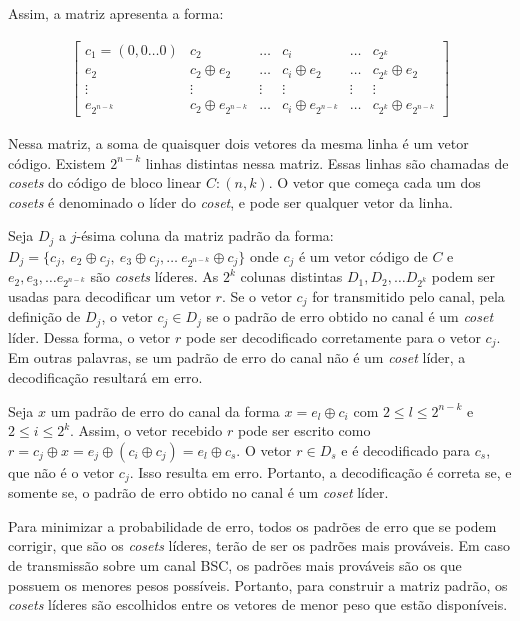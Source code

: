 Assim, a matriz apresenta a forma:

\begin{align*}
\left[\begin{array}{cccccc}
c_1=(0,0 \ldots 0) & c_2 & \ldots & c_i & \ldots & c_{2^k}\\
e_2 & c_2 \oplus e_2 & \ldots & c_i \oplus e_2 & \ldots & c_{2^k} \oplus e_2\\
\vdots & \vdots & \vdots & \vdots & \vdots & \vdots\\
e_{2^{n-k}} & c_2 \oplus e_{2^{n-k}} & \ldots & c_i \oplus e_{2^{n-k}} & \ldots & c_{2^k} \oplus e_{2^{n-k}}
\end{array}\right]
\end{align*}

Nessa matriz, a soma de quaisquer dois vetores da mesma linha é um vetor código. Existem  $2^{n-k}$ linhas distintas nessa matriz. Essas linhas são chamadas de \emph{cosets} do código de bloco linear $C:(n,k)$. O vetor que começa cada um dos \emph{cosets} é denominado o líder do \emph{coset}, e pode ser qualquer vetor da linha.

Seja $D_j$ a $j$-ésima coluna da matriz padrão da forma: $D_j=\{ c_j,\ e_2 \oplus c_j,\ e_3 \oplus c_j, \ldots\ e_{2^{n-k}} \oplus c_j\}$ onde $c_j$ é um vetor código de $C$ e $e_2, e_3, \ldots e_{2^{n-k}}$ são \emph{cosets} líderes. As $2^k$ colunas distintas $D_1, D_2, \ldots D_{2^{k}}$ podem ser usadas para decodificar um vetor $r$. Se o vetor $c_j$ for transmitido pelo canal, pela definição de $D_j$, o vetor $c_j \in D_j$ se o padrão de erro obtido no canal é um \emph{coset} líder. Dessa forma, o vetor $r$ pode ser decodificado corretamente para o vetor $c_j$. Em outras palavras, se um padrão de erro do canal não é um \emph{coset} líder, a decodificação resultará em erro.

Seja $x$ um padrão de erro do canal da forma $x=e_l \oplus c_i$ com $2 \leq l \leq 2^{n-k}$ e $2 \leq i \leq 2^k$. Assim, o vetor recebido $r$ pode ser escrito como $r=c_j \oplus x=e_j \oplus (c_i \oplus c_j)=e_l \oplus c_s$. O vetor $r \in D_s$ e é decodificado para $c_s$, que não é o vetor $c_j$. Isso resulta em erro. Portanto, a decodificação é correta se, e somente se, o padrão de erro obtido no canal é um \emph{coset} líder.

Para minimizar a probabilidade de erro, todos os padrões de erro que se podem corrigir, que são os \emph{cosets} líderes, terão de ser os padrões mais prováveis. Em caso de transmissão sobre um canal BSC, os padrões mais prováveis são os que possuem os menores pesos possíveis. Portanto, para construir a matriz padrão, os \emph{cosets} líderes são escolhidos entre os vetores de menor peso que estão disponíveis.


